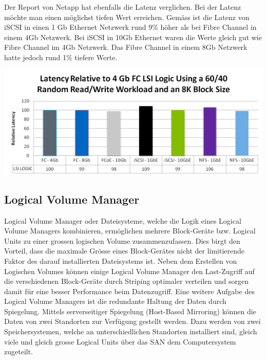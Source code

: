 Der Report von Netapp hat ebenfalls die Latenz verglichen. Bei der Latenz möchte man einen möglichst tiefen Wert erreichen. Gemäss  ist die Latenz von iSCSI in einen 1 Gb Ethernet Netzwerk rund 9\% höher als bei Fibre Channel in einem 4Gb Netzwerk. Bei iSCSI in 10Gb Ethernet waren die Werte gleich gut wie Fibre Channel im 4Gb Netzwerk. Das Fibre Channel in einem 8Gb Netzwerk hatte jedoch rund 1\% tiefere Werte.\cite{Jafri2011}

\begin{center}
\includegraphics[width=\linewidth, keepaspectratio = true]{media/netapp_latence.png}
\end{center}
 
\subsection{Logical Volume Manager}
Logical Volume Manager oder Dateisysteme, welche die Logik eines Logical Volume Managers kombinieren, ermöglichen mehrere Block-Geräte bzw. Logical Units zu einer grossen logischen Volume zusammenzufassen. Dies birgt den Vorteil, dass die maximale Grösse eines Block-Gerätes nicht der limitierende Faktor des darauf installierten Dateisystems ist. Neben dem Erstellen von Logischen Volumes können einige Logical Volume Manager den Last-Zugriff auf die verschiedenen Block-Geräte durch Striping optimaler verteilen und sorgen damit für eine besser Performance beim Datenzugriff. Eine weitere Aufgabe des Logical Volume Managers ist die redundante Haltung der Daten durch Spiegelung. Mittels serverseitiger Spiegelung (Host-Based Mirroring) können die Daten von zwei Standorten zur Verfügung gestellt werden. Dazu werden von zwei Speichersystemen, welche an unterschiedlichen Standorten installiert sind, gleich viele und gleich grosse Logical Units über das SAN dem Computersystem zugeteilt.

